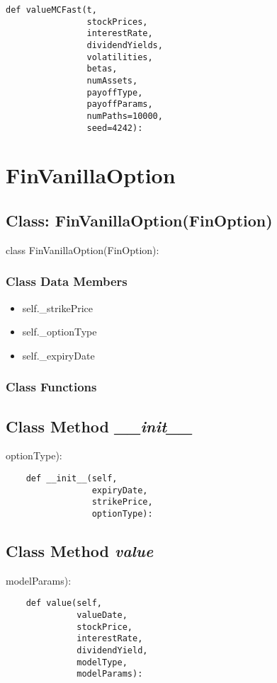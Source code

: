 \documentclass[twoside,11pt]{book}
\begin{document}
\begin{lstlisting}
def valueMCFast(t,
                stockPrices,
                interestRate,
                dividendYields,
                volatilities,
                betas,
                numAssets,
                payoffType,
                payoffParams,
                numPaths=10000,
                seed=4242):
\end{lstlisting}

\newpage
\section{FinVanillaOption}

\subsection{Class: FinVanillaOption(FinOption)}
class FinVanillaOption(FinOption):

\subsubsection{Class Data Members}
\begin{itemize}
\item{self.\_strikePrice}
\item{self.\_optionType}
\item{self.\_expiryDate}
\end{itemize}

\subsubsection{Class Functions}

\subsection{Class Method {\it \_\_init\_\_}}
optionType):

\begin{lstlisting}
    def __init__(self,
                 expiryDate,
                 strikePrice,
                 optionType):
\end{lstlisting}

\subsection{Class Method {\it value}}
modelParams):

\begin{lstlisting}
    def value(self,
              valueDate,
              stockPrice,
              interestRate,
              dividendYield,
              modelType,
              modelParams):
\end{lstlisting}
\end{document}
